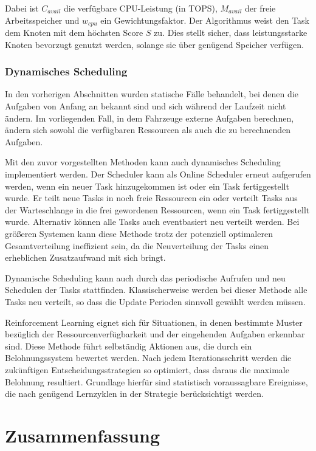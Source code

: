 Dabei ist $C_{avail}$ die verfügbare CPU-Leistung (in TOPS), $M_{avail}$ der freie Arbeitsspeicher und $w_{cpu}$ ein Gewichtungsfaktor. Der Algorithmus weist den Task dem Knoten mit dem höchsten Score $S$ zu. Dies stellt sicher, dass leistungsstarke Knoten bevorzugt genutzt werden, solange sie über genügend Speicher verfügen.

\subsubsection{Dynamisches Scheduling}
\label{Dynamisches Scheduling}

In den vorherigen Abschnitten wurden statische Fälle behandelt, bei denen die Aufgaben von Anfang an bekannt sind und sich während der Laufzeit nicht ändern. Im vorliegenden Fall, in dem Fahrzeuge externe Aufgaben berechnen, ändern sich sowohl die verfügbaren Ressourcen als auch die zu berechnenden Aufgaben. 

Mit den zuvor vorgestellten Methoden kann auch dynamisches Scheduling implementiert werden. Der Scheduler kann als Online Scheduler erneut aufgerufen werden, wenn ein neuer Task hinzugekommen ist oder ein Task fertiggestellt wurde. Er teilt neue Tasks in noch freie Ressourcen ein oder verteilt Tasks aus der Warteschlange in die frei gewordenen Ressourcen, wenn ein Task fertiggestellt wurde. Alternativ können alle Tasks auch eventbasiert neu verteilt werden. Bei größeren Systemen kann diese Methode trotz der potenziell optimaleren Gesamtverteilung ineffizient sein, da die Neuverteilung der Tasks einen erheblichen Zusatzaufwand mit sich bringt.

Dynamische Scheduling kann auch durch das periodische Aufrufen und neu Schedulen der Tasks stattfinden. Klassischerweise werden bei dieser Methode alle Tasks neu verteilt, so dass die Update Perioden sinnvoll gewählt werden müssen. 

Reinforcement Learning eignet sich für Situationen, in denen bestimmte Muster bezüglich der Ressourcenverfügbarkeit und der eingehenden Aufgaben erkennbar sind. Diese Methode führt selbständig Aktionen aus, die durch ein Belohnungssystem bewertet werden. Nach jedem Iterationsschritt werden die zukünftigen Entscheidungsstrategien so optimiert, dass daraus die maximale Belohnung resultiert. Grundlage hierfür sind statistisch voraussagbare Ereignisse, die nach genügend Lernzyklen in der Strategie berücksichtigt werden.

\section{Zusammenfassung}
\label{sec:MethodeZusammenfassung}

